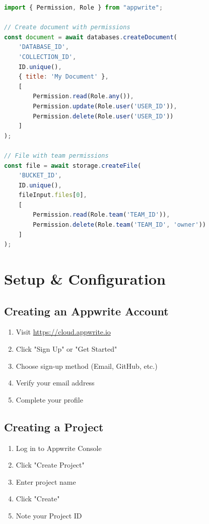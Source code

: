 \documentclass[11pt,a4paper,oneside]{book}
\begin{document}
\begin{lstlisting}[language=JavaScript, caption=Permission Examples]
import { Permission, Role } from "appwrite";

// Create document with permissions
const document = await databases.createDocument(
    'DATABASE_ID',
    'COLLECTION_ID',
    ID.unique(),
    { title: 'My Document' },
    [
        Permission.read(Role.any()),
        Permission.update(Role.user('USER_ID')),
        Permission.delete(Role.user('USER_ID'))
    ]
);

// File with team permissions
const file = await storage.createFile(
    'BUCKET_ID',
    ID.unique(),
    fileInput.files[0],
    [
        Permission.read(Role.team('TEAM_ID')),
        Permission.delete(Role.team('TEAM_ID', 'owner'))
    ]
);
\end{lstlisting}

\chapter{Setup \& Configuration}

\section{Creating an Appwrite Account}

\begin{enumerate}
    \item Visit \url{https://cloud.appwrite.io}
    \item Click "Sign Up" or "Get Started"
    \item Choose sign-up method (Email, GitHub, etc.)
    \item Verify your email address
    \item Complete your profile
\end{enumerate}

\section{Creating a Project}

\begin{enumerate}
    \item Log in to Appwrite Console
    \item Click "Create Project"
    \item Enter project name
    \item Click "Create"
    \item Note your Project ID
\end{enumerate}
\end{document}
